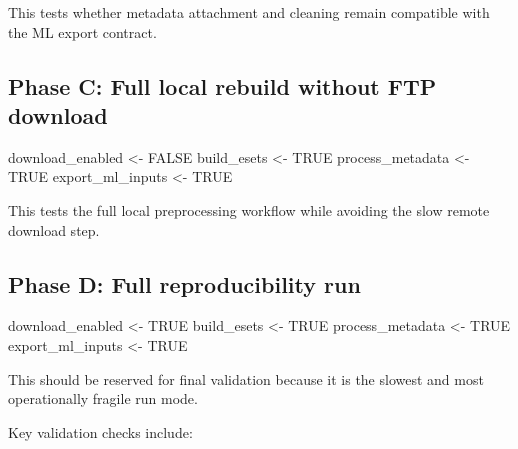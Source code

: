 \documentclass[
  letterpaper,
  DIV=11,
  numbers=noendperiod,
  openany,
  oneside]{scrreprt}
\newenvironment{Shaded}{\begin{snugshade}}{\end{snugshade}}
\newcommand{\ConstantTok}[1]{\textcolor[rgb]{0.56,0.35,0.01}{#1}}
\newcommand{\NormalTok}[1]{\textcolor[rgb]{0.00,0.23,0.31}{#1}}
\newcommand{\OtherTok}[1]{\textcolor[rgb]{0.00,0.23,0.31}{#1}}
\begin{document}
This tests whether metadata attachment and cleaning remain compatible
with the ML export contract.

\subsection*{Phase C: Full local rebuild without FTP
download}\label{phase-c-full-local-rebuild-without-ftp-download}

\begin{Shaded}
\begin{Highlighting}[]
\NormalTok{download\_enabled }\OtherTok{\textless{}{-}} \ConstantTok{FALSE}
\NormalTok{build\_esets      }\OtherTok{\textless{}{-}} \ConstantTok{TRUE}
\NormalTok{process\_metadata }\OtherTok{\textless{}{-}} \ConstantTok{TRUE}
\NormalTok{export\_ml\_inputs }\OtherTok{\textless{}{-}} \ConstantTok{TRUE}
\end{Highlighting}
\end{Shaded}

This tests the full local preprocessing workflow while avoiding the slow
remote download step.

\subsection*{Phase D: Full reproducibility
run}\label{phase-d-full-reproducibility-run}

\begin{Shaded}
\begin{Highlighting}[]
\NormalTok{download\_enabled }\OtherTok{\textless{}{-}} \ConstantTok{TRUE}
\NormalTok{build\_esets      }\OtherTok{\textless{}{-}} \ConstantTok{TRUE}
\NormalTok{process\_metadata }\OtherTok{\textless{}{-}} \ConstantTok{TRUE}
\NormalTok{export\_ml\_inputs }\OtherTok{\textless{}{-}} \ConstantTok{TRUE}
\end{Highlighting}
\end{Shaded}

This should be reserved for final validation because it is the slowest
and most operationally fragile run mode.

Key validation checks include:
\end{document}

